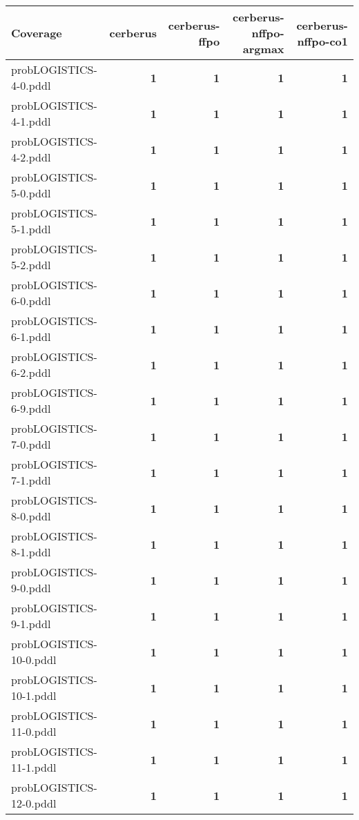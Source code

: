 \documentclass{article}
\begin{document}
\begin{tabular}{@{}lrrrr@{}}
Coverage & cerberus & cerberus-ffpo & cerberus-nffpo-argmax & cerberus-nffpo-co1 \\
\midrule
probLOGISTICS-4-0.pddl & \textbf{1} & \textbf{1} & \textbf{1} & \textbf{1} \\
probLOGISTICS-4-1.pddl & \textbf{1} & \textbf{1} & \textbf{1} & \textbf{1} \\
probLOGISTICS-4-2.pddl & \textbf{1} & \textbf{1} & \textbf{1} & \textbf{1} \\
probLOGISTICS-5-0.pddl & \textbf{1} & \textbf{1} & \textbf{1} & \textbf{1} \\
probLOGISTICS-5-1.pddl & \textbf{1} & \textbf{1} & \textbf{1} & \textbf{1} \\
probLOGISTICS-5-2.pddl & \textbf{1} & \textbf{1} & \textbf{1} & \textbf{1} \\
probLOGISTICS-6-0.pddl & \textbf{1} & \textbf{1} & \textbf{1} & \textbf{1} \\
probLOGISTICS-6-1.pddl & \textbf{1} & \textbf{1} & \textbf{1} & \textbf{1} \\
probLOGISTICS-6-2.pddl & \textbf{1} & \textbf{1} & \textbf{1} & \textbf{1} \\
probLOGISTICS-6-9.pddl & \textbf{1} & \textbf{1} & \textbf{1} & \textbf{1} \\
probLOGISTICS-7-0.pddl & \textbf{1} & \textbf{1} & \textbf{1} & \textbf{1} \\
probLOGISTICS-7-1.pddl & \textbf{1} & \textbf{1} & \textbf{1} & \textbf{1} \\
probLOGISTICS-8-0.pddl & \textbf{1} & \textbf{1} & \textbf{1} & \textbf{1} \\
probLOGISTICS-8-1.pddl & \textbf{1} & \textbf{1} & \textbf{1} & \textbf{1} \\
probLOGISTICS-9-0.pddl & \textbf{1} & \textbf{1} & \textbf{1} & \textbf{1} \\
probLOGISTICS-9-1.pddl & \textbf{1} & \textbf{1} & \textbf{1} & \textbf{1} \\
probLOGISTICS-10-0.pddl & \textbf{1} & \textbf{1} & \textbf{1} & \textbf{1} \\
probLOGISTICS-10-1.pddl & \textbf{1} & \textbf{1} & \textbf{1} & \textbf{1} \\
probLOGISTICS-11-0.pddl & \textbf{1} & \textbf{1} & \textbf{1} & \textbf{1} \\
probLOGISTICS-11-1.pddl & \textbf{1} & \textbf{1} & \textbf{1} & \textbf{1} \\
probLOGISTICS-12-0.pddl & \textbf{1} & \textbf{1} & \textbf{1} & \textbf{1} \\

\end{tabular}
\end{document}
